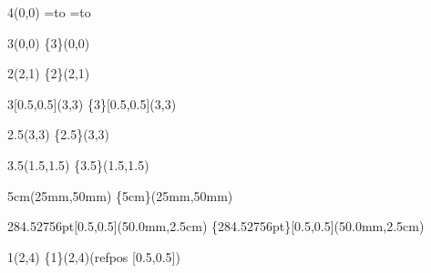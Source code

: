 \documentclass{article}
\begin{document}
\begin{textblock}{4}(0,0)
  \lineskip=0pt  %
  =\hbox to 
  =\vbox to 
\end{textblock}

\begin{textblock}{3}(0,0)
\{3\}(0,0)
\end{textblock}

\begin{textblock}{2}(2,1)
\{2\}(2,1)
\end{textblock}

\begin{textblock}{3}[0.5,0.5](3,3)
\{3\}[0.5,0.5](3,3)
\end{textblock}

\begin{textblock}{2.5}(3,3)
\{2.5\}(3,3)
\end{textblock}

\begin{textblock}{3.5}(1.5,1.5)
\{3.5\}(1.5,1.5)
\end{textblock}

\begin{textblock*}{5cm}(25mm,50mm)
\{5cm\}(25mm,50mm)
\end{textblock*}

\begin{textblock*}{284.52756pt}[0.5,0.5](50.0mm,2.5cm)
\{284.52756pt\}[0.5,0.5](50.0mm,2.5cm)
\end{textblock*}

\begin{textblock}{1}(2,4)
\{1\}(2,4)\hfil\break (refpos [0.5,0.5])
\end{textblock}

\end{document}
